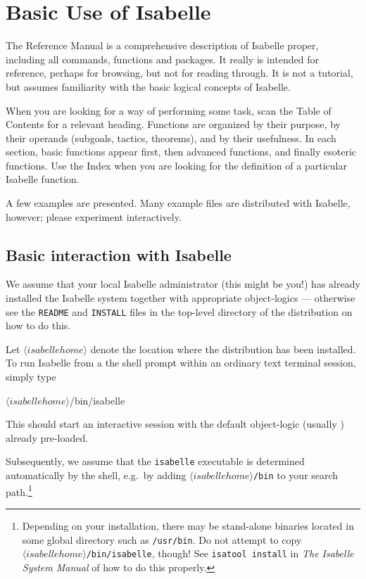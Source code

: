

\chapter{Basic Use of Isabelle} 
The Reference Manual is a comprehensive description of Isabelle
proper, including all \ML{} commands, functions and packages.  It
really is intended for reference, perhaps for browsing, but not for
reading through.  It is not a tutorial, but assumes familiarity with
the basic logical concepts of Isabelle.

When you are looking for a way of performing some task, scan the Table of
Contents for a relevant heading.  Functions are organized by their purpose,
by their operands (subgoals, tactics, theorems), and by their usefulness.
In each section, basic functions appear first, then advanced functions, and
finally esoteric functions.  Use the Index when you are looking for the
definition of a particular Isabelle function.

A few examples are presented.  Many example files are distributed with
Isabelle, however; please experiment interactively.


\section{Basic interaction with Isabelle}
\nobreak
%
We assume that your local Isabelle administrator (this might be you!) has
already installed the Isabelle system together with appropriate object-logics
--- otherwise see the \texttt{README} and \texttt{INSTALL} files in the
top-level directory of the distribution on how to do this.

\medskip Let $\langle isabellehome \rangle$ denote the location where
the distribution has been installed.  To run Isabelle from a the shell
prompt within an ordinary text terminal session, simply type
\begin{ttbox}
\({\langle}isabellehome{\rangle}\)/bin/isabelle
\end{ttbox}
This should start an interactive \ML{} session with the default object-logic
(usually {\HOL}) already pre-loaded.

Subsequently, we assume that the \texttt{isabelle} executable is determined
automatically by the shell, e.g.\ by adding {\tt \(\langle isabellehome
  \rangle\)/bin} to your search path.\footnote{Depending on your installation,
  there may be stand-alone binaries located in some global directory such as
  \texttt{/usr/bin}.  Do not attempt to copy {\tt \(\langle isabellehome
    \rangle\)/bin/isabelle}, though!  See \texttt{isatool install} in
  \emph{The Isabelle System Manual} of how to do this properly.}

